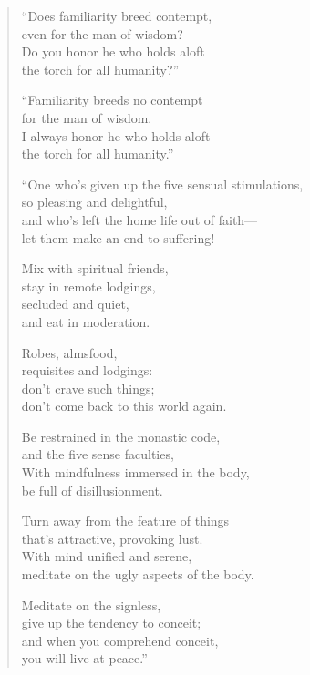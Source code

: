 \documentclass[12pt,openany]{book}%
\begin{document}
\begin{verse}%
“Does familiarity breed contempt, \\
even for the man of wisdom? \\
Do you honor he who holds aloft \\
the torch for all humanity?” 

“Familiarity breeds no contempt \\
for the man of wisdom. \\
I always honor he who holds aloft \\
the torch for all humanity.” 

“One who’s given up the five sensual stimulations, \\
so pleasing and delightful, \\
and who’s left the home life out of faith—\\
let them make an end to suffering! 

Mix with spiritual friends, \\
stay in remote lodgings, \\
secluded and quiet, \\
and eat in moderation. 

Robes, almsfood, \\
requisites and lodgings: \\
don’t crave such things; \\
don’t come back to this world again. 

Be restrained in the monastic code, \\
and the five sense faculties, \\
With mindfulness immersed in the body, \\
be full of disillusionment. 

Turn away from the feature of things \\
that’s attractive, provoking lust. \\
With mind unified and serene, \\
meditate on the ugly aspects of the body. 

Meditate on the signless, \\
give up the tendency to conceit; \\
and when you comprehend conceit, \\
you will live at peace.” 

%
\end{verse}
\end{document}
